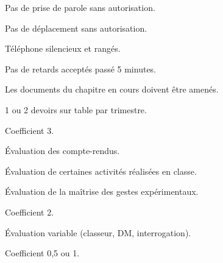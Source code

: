 \newpage
\pasDePagination


\large

\begin{listePoints}
  \item {}
  \item Pas de prise de parole sans autorisation.
  \item Pas de déplacement sans autorisation.
  \item Téléphone silencieux et rangés.
  \item Pas de retards acceptés passé 5 minutes.
  \item Les documents du chapitre en cours doivent  être amenés.
\end{listePoints}

\begin{center}
\end{center}

\vspace*{-0.2cm}
\ligne




\begin{listePoints}
  \item 1 ou 2 devoirs sur table par trimestre.
  \item {}
  \item Coefficient 3.
\end{listePoints}



\begin{listePoints}
  \item Évaluation des compte-rendus.
  \item Évaluation de certaines activités réalisées en classe.
  \item Évaluation de la maîtrise des gestes expérimentaux.
  \item Coefficient 2.
\end{listePoints}



\begin{listePoints}
  \item Évaluation variable (classeur, DM, interrogation).
  \item Coefficient 0,5 ou 1.
\end{listePoints}


